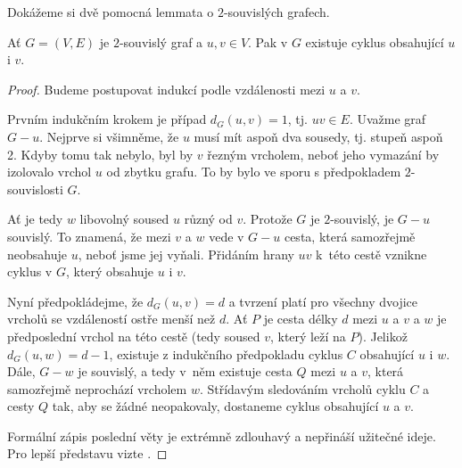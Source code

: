 Dokážeme si dvě pomocná lemmata o $2$-souvislých grafech.

\begin{lemma}
 \label{lem:2-souvisly-cyklus}
 Ať $G = (V,E)$ je $2$-souvislý graf a $u,v \in V$. Pak v $G$ existuje cyklus
 obsahující $u$ i $v$.
\end{lemma}
\begin{proof}
 Budeme postupovat indukcí podle vzdálenosti mezi $u$ a $v$.

 Prvním indukčním krokem je případ $d_G(u,v) = 1$, tj. $uv \in E$. Uvažme graf
 $G - u$. Nejprve si všimněme, že $u$ musí mít aspoň dva sousedy, tj. stupeň
 aspoň 2. Kdyby tomu tak nebylo, byl by $v$ řezným vrcholem, neboť jeho vymazání
 by izolovalo vrchol $u$ od zbytku grafu. To by bylo ve sporu s předpokladem
 $2$-souvislosti $G$.

 Ať je tedy $w$ libovolný soused $u$ různý od $v$. Protože $G$ je $2$-souvislý,
 je $G - u$ souvislý. To znamená, že mezi $v$ a $w$ vede v $G - u$ cesta, která
 samozřejmě neobsahuje $u$, neboť jsme jej vyňali. Přidáním hrany $uv$ k~této
 cestě vznikne cyklus v $G$, který obsahuje $u$ i $v$.

 Nyní předpokládejme, že $d_G(u,v) = d$ a tvrzení platí pro všechny dvojice
 vrcholů se vzdáleností ostře menší než $d$. Ať $P$ je cesta délky $d$ mezi $u$
 a $v$ a $w$ je předposlední vrchol na této cestě (tedy soused $v$, který leží
 na $P$). Jelikož $d_G(u,w) = d - 1$, existuje z indukčního předpokladu cyklus
 $C$ obsahující $u$ i $w$. Dále, $G - w$ je souvislý, a tedy v~něm existuje
 cesta $Q$ mezi $u$ a $v$, která samozřejmě neprochází vrcholem $w$. Střídavým
 sledováním vrcholů cyklu $C$ a cesty $Q$ tak, aby se žádné neopakovaly,
 dostaneme cyklus obsahující $u$ a $v$.

 Formální zápis poslední věty je extrémně zdlouhavý a nepřináší užitečné ideje.
 Pro lepší představu vizte .
\end{proof}

